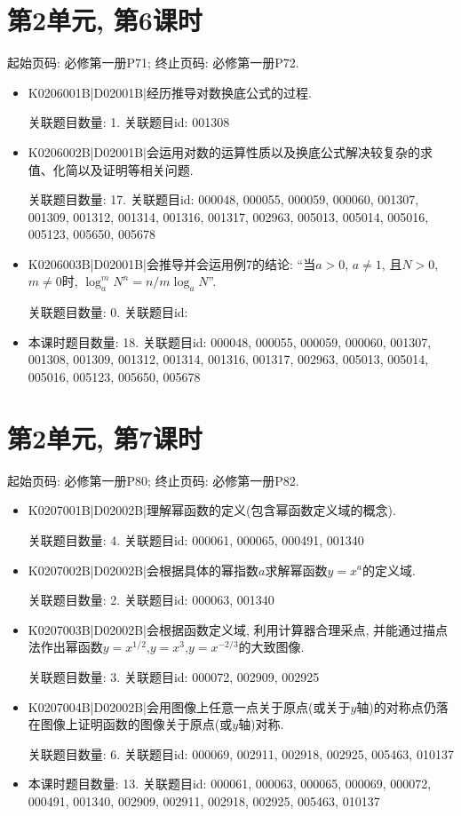 \section*{第2单元, 第6课时}
起始页码: 必修第一册P71; 终止页码: 必修第一册P72.
\begin{itemize}
\item K0206001B|D02001B|经历推导对数换底公式的过程.

关联题目数量: 1. 关联题目id: 001308

\item K0206002B|D02001B|会运用对数的运算性质以及换底公式解决较复杂的求值、化简以及证明等相关问题.

关联题目数量: 17. 关联题目id: 000048, 000055, 000059, 000060, 001307, 001309, 001312, 001314, 001316, 001317, 002963, 005013, 005014, 005016, 005123, 005650, 005678

\item K0206003B|D02001B|会推导并会运用例7的结论: ``当$a>0$, $a\neq1$, 且$N>0$, $m\neq0$时, $\log_a^{m}N^{n}=n/m\log_aN$''.

关联题目数量: 0. 关联题目id: 

\item 本课时题目数量: 18. 关联题目id: 000048, 000055, 000059, 000060, 001307, 001308, 001309, 001312, 001314, 001316, 001317, 002963, 005013, 005014, 005016, 005123, 005650, 005678

\end{itemize}

\section*{第2单元, 第7课时}
起始页码: 必修第一册P80; 终止页码: 必修第一册P82.
\begin{itemize}
\item K0207001B|D02002B|理解幂函数的定义(包含幂函数定义域的概念).

关联题目数量: 4. 关联题目id: 000061, 000065, 000491, 001340

\item K0207002B|D02002B|会根据具体的幂指数$a$求解幂函数$y=x^{a}$的定义域.

关联题目数量: 2. 关联题目id: 000063, 001340

\item K0207003B|D02002B|会根据函数定义域, 利用计算器合理采点, 并能通过描点法作出幂函数$y=x^{1/2}$,$y=x^{3}$,$y=x^{-2/3}$的大致图像.

关联题目数量: 3. 关联题目id: 000072, 002909, 002925

\item K0207004B|D02002B|会用图像上任意一点关于原点(或关于$y$轴)的对称点仍落在图像上证明函数的图像关于原点(或$y$轴)对称.

关联题目数量: 6. 关联题目id: 000069, 002911, 002918, 002925, 005463, 010137

\item 本课时题目数量: 13. 关联题目id: 000061, 000063, 000065, 000069, 000072, 000491, 001340, 002909, 002911, 002918, 002925, 005463, 010137

\end{itemize}

